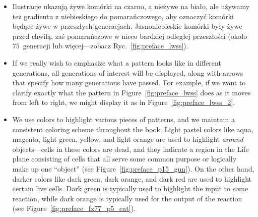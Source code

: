 \begin{itemize}
	\item Ilustracje ukazują żywe komórki na czarno, a nieżywe na biało, ale używamy też gradientu z niebieskiego do pomarańczowego, aby oznaczyć komórki będące żywe w przeszłych generacjach. Jasnoniebieskie komórki były żywe przed chwilą, zaś pomarańczowe w nieco bardziej odległej przeszłości (około $75$~generacji lub więcej---zobacz Ryc.~\ref{fig:preface_lwss}).\bigskip

	\noindent\begin{minipage}{\linewidth}
		\centering{}
		\label{fig:preface_lwss}\bigskip
	\end{minipage}
	
	\item If we really wish to emphasize what a pattern looks like in different generations, all generations of interest will be displayed, along with arrows that specify how many generations have passed. For example, if we want to clarify exactly what the pattern in Figure~\ref{fig:preface_lwss} does as it moves from left to right, we might display it as in Figure~\ref{fig:preface_lwss_2}.\bigskip
	
	\noindent\begin{minipage}{\linewidth}
		\centering{}
		\label{fig:preface_lwss_2}\bigskip
	\end{minipage}

	\item We use colors to highlight various pieces of patterns, and we maintain a consistent coloring scheme throughout the book. Light pastel colors like aqua, magenta, light green, yellow, and light orange are used to highlight \emph{around} objects---cells in these colors are dead, and they indicate a region in the Life plane consisting of cells that all serve some common purpose or logically make up one ``object'' (see Figure~\ref{fig:preface_p15_gun}). On the other hand, darker colors like dark green, dark orange, and dark red are used to highlight certain live cells. Dark green is typically used to highlight the input to some reaction, while dark orange is typically used for the output of the reaction (see Figure~\ref{fig:preface_fx77_p5_eat}).\bigskip
	

\end{itemize}
